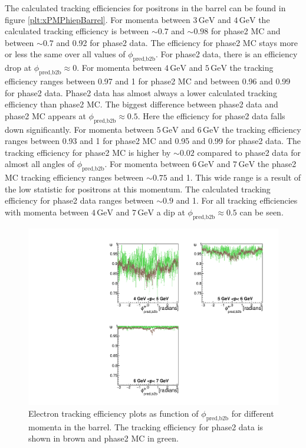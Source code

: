 \documentclass[a4paper,11pt,twosided,final,german,openbib,pdftex,listof=totoc,bibliography=totoc]{scrbook}
\begin{document}
The calculated tracking efficiencies for positrons in the barrel can be found in figure \ref{plt:xPMPhiepBarrel}. 
For momenta between $3\,\textrm{GeV}$ and $4\,\textrm{GeV}$ the calculated tracking efficiency is between $\sim 0.7$ and $\sim 0.98$ for phase2 MC and between $\sim 0.7$ and 0.92 for phase2 data. The efficiency for phase2 MC stays more or less the same over all values of $\phi_{\textrm{pred,b2b}}$. For phase2 data, there is an efficiency drop at $\phi_{\textrm{pred,b2b}} \approx 0$.
For momenta between $4\,\textrm{GeV}$ and $5\,\textrm{GeV}$ the tracking efficiency ranges between 0.97 and 1 for phase2 MC and between 0.96 and 0.99 for phase2 data. Phase2 data has almost always a lower calculated tracking efficiency than phase2 MC.
The biggest difference between phase2 data and phase2 MC appears at $\phi_{\textrm{pred,b2b}} \approx 0.5$. Here the efficiency for phase2 data falls down significantly. 
For momenta between $5\,\textrm{GeV}$ and $6\,\textrm{GeV}$ the tracking efficiency ranges between 0.93 and 1 for phase2 MC and 0.95  and 0.99 for phase2 data. The tracking efficiency for phase2 MC is higher by $\sim 0.02$ compared to phase2 data for almost all  angles of $\phi_{\textrm{pred,b2b}}$. 
For momenta between $6\,\textrm{GeV}$ and $7\,\textrm{GeV}$ the phase2 MC tracking efficiency ranges between $\sim 0.75$ and 1. This wide range is a result of the low statistic for positrons at this momentum. The calculated tracking efficiency for phase2 data ranges between $\sim 0.9$ and 1. For all tracking efficiencies with momenta between $4\,\textrm{GeV}$ and $7\,\textrm{GeV}$ a dip at $\phi_{\textrm{pred,b2b}} \approx 0.5$ can be seen.

\begin{figure}[!htbp]
	\centering
	\includegraphics[width=\textwidth]{Plots/master/xPMPhiemBarrel}
	\caption[Momentum $\phi_{\textrm{pred,b2b}}$ Electron Barrel Efficiency Phase2]{Electron tracking efficiency plots as function of $\phi_{\textrm{pred,b2b}}$ for different momenta in the barrel. The tracking efficiency for phase2 data is shown in brown and phase2 MC in green.}
	\label{plt:xPMPhiemBarrel}
\end{figure}
\end{document}
